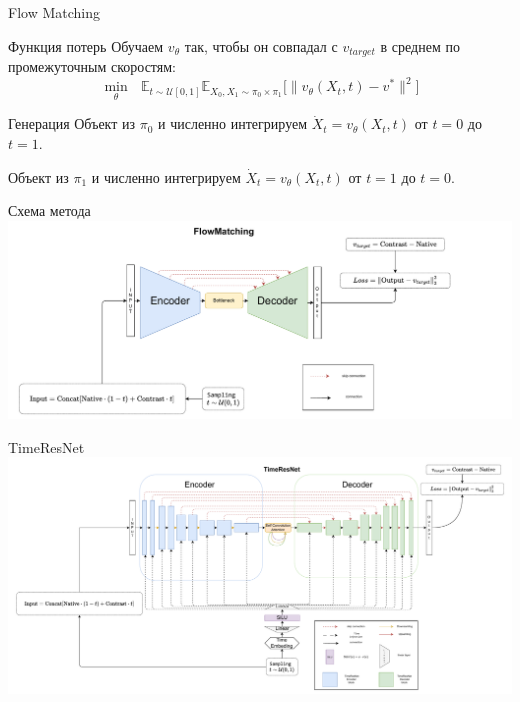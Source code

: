 \documentclass[11pt]{beamer}
\begin{document}
\begin{frame}{Flow Matching}
\begin{block}{Функция потерь}
    Обучаем $v_{\theta}$ так, чтобы он совпадал с $v_{target}$ 
в среднем по промежуточным скоростям:
\begin{equation*}
  \min_{\theta} \text{  } \mathbb{E}_{t \sim \mathcal{U}[0,1]}
  \mathbb{E}_{X_0, X_1 \sim \pi_0 \times \pi_1} \bigl[\|v_{\theta}(X_t, t) - v^*\|^{2}\bigr] 
\end{equation*}
\end{block}

\begin{block}{Генерация}
Объект из $\pi_0$ и численно интегрируем  $\dot X_t = v_{\theta}(X_t, t)$ от $t = 0$ до $t = 1$.

Объект из $\pi_1$ и численно интегрируем $\dot X_t = v_{\theta}(X_t, t)$ от $t = 1$ до $t = 0$.

\end{block}
\end{frame}



\begin{frame}{Схема метода}
\includegraphics[width=\linewidth]{images/flow.pdf}
\end{frame}

\begin{frame}{TimeResNet}
\includegraphics[width=\linewidth]{images/timeresnet.pdf}
\end{frame}
\end{document}
